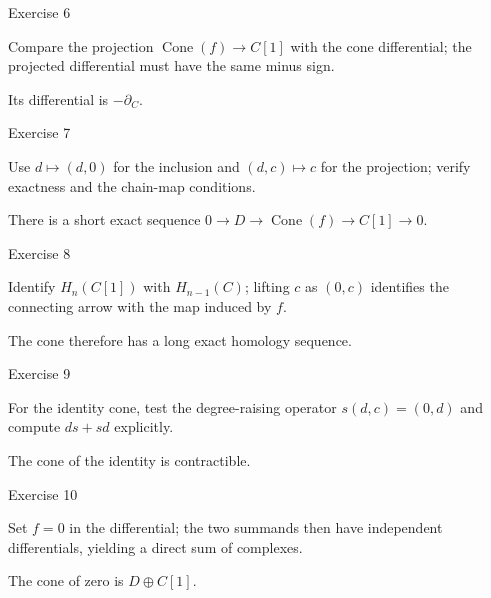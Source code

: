 \begin{exercise}\label{exr:viii24-06}
Exercise 6
\end{exercise}
\begin{hint}
Compare the projection \(\operatorname{Cone}(f)\to C[1]\) with the cone differential; the projected differential must have the same minus sign.
\end{hint}
\begin{solution}
Its differential is \(-\partial_C\).
\end{solution}

\begin{exercise}\label{exr:viii24-07}
Exercise 7
\end{exercise}
\begin{hint}
Use \(d\mapsto(d,0)\) for the inclusion and \((d,c)\mapsto c\) for the projection; verify exactness and the chain-map conditions.
\end{hint}
\begin{solution}
There is a short exact sequence \(0\to D\to\operatorname{Cone}(f)\to C[1]\to0\).
\end{solution}

\begin{exercise}\label{exr:viii24-08}
Exercise 8
\end{exercise}
\begin{hint}
Identify \(H_n(C[1])\) with \(H_{n-1}(C)\); lifting \(c\) as \((0,c)\) identifies the connecting arrow with the map induced by \(f\).
\end{hint}
\begin{solution}
The cone therefore has a long exact homology sequence.
\end{solution}

\begin{exercise}\label{exr:viii24-09}
Exercise 9
\end{exercise}
\begin{hint}
For the identity cone, test the degree-raising operator \(s(d,c)=(0,d)\) and compute \(ds+sd\) explicitly.
\end{hint}
\begin{solution}
The cone of the identity is contractible.
\end{solution}

\begin{exercise}\label{exr:viii24-10}
Exercise 10
\end{exercise}
\begin{hint}
Set \(f=0\) in the differential; the two summands then have independent differentials, yielding a direct sum of complexes.
\end{hint}
\begin{solution}
The cone of zero is \(D\oplus C[1]\).
\end{solution}

